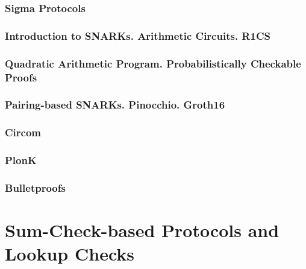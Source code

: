 \documentclass{zkdl-template}
\begin{document}
    \section{Sigma Protocols}\label{section:sigma}
    

    \section[Arithmetic Circuits. R1CS]{Introduction to SNARKs. Arithmetic Circuits. R1CS} \label{section:r1cs}
    \label{section:circuits}

    \section[Quadratic Arithmetic Program]{Quadratic Arithmetic Program. Probabilistically Checkable Proofs}\label{section:qap-pcp}
    

    \section[Pairing-based SNARKs]{Pairing-based SNARKs. Pinocchio. Groth16}\label{section:groth}
    

    \section{Circom}\label{section:circom}
    

    \section{PlonK}\label{section:plonk}
    


    \section{Bulletproofs}\label{section:bulletproofs}
    

    
    \part{Sum-Check-based Protocols and Lookup Checks}
\end{document}
